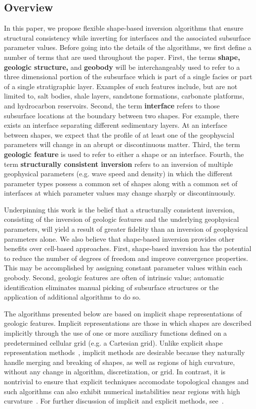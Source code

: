 \documentclass[manuscript,revised]{geophysics}
\begin{document}
\subsection{Overview}
In this paper, we propose flexible shape-based inversion algorithms that ensure structural consistency while inverting for interfaces and the associated subsurface parameter values.  Before going into the details of the algorithms, we first define a number of terms that are used throughout the paper.  First, the terms \textbf{shape, geologic structure,} and \textbf{geobody} will be interchangeably used to refer to a three dimensional portion of the subsurface which is part of a single facies or part of a single stratigraphic layer.  Examples of such features include, but are not limited to, salt bodies, shale layers, sandstone formations, carbonate platforms, and hydrocarbon reservoirs.  Second, the term \textbf{interface} refers to those subsurface locations at the boundary between two shapes.  For example, there exists an interface separating different sedimentary layers.  At an interface between shapes, we expect that the profile of at least one of the geophyscial parameters will change in an abrupt or discontinuous matter.  Third, the term \textbf{geologic feature} is used to refer to either a shape or an interface.  Fourth, the term \textbf{structurally consistent inversion} refers to an inversion of multiple geophysical parameters (e.g. wave speed and density) in which the different parameter types possess a common set of shapes along with a common set of interfaces at which parameter values may change sharply or discontinuously. 

Underpinning this work is the belief that a structurally consistent inversion, consisting of the inversion of geologic features and the underlying geophysical parameters, will yield a result of greater fidelity than an inversion of geophysical parameters alone.  We also believe that shape-based inversion provides other benefits over cell-based approaches.  First, shape-based inversion has the potential to reduce the number of degrees of freedom and improve convergence properties.  This may be accomplished by assigning constant parameter values within each geobody.   Second, geologic features are often of intrinsic value; automatic identification eliminates manual picking of subsurface structures or the application of additional algorithms to do so.

The algorithms presented below are based on implicit shape representations of geologic features.  Implicit representations are those in which shapes are described implicitly through the use of one or more auxiliary functions defined on a predetermined cellular grid (e.g. a Cartesian grid). Unlike explicit shape representation methods~\cite{Galley20}, implicit methods are desirable because they naturally handle merging and breaking of shapes, as well as regions of high curvature, without any change in algorithm, discretization, or grid.   In contrast, it is nontrivial to ensure that explicit techniques accomodate topological changes and such algorithms can also exhibit numerical instabilities near regions with high curvature~\cite{Abubakar_2009}.  For further discussion of implicit and explicit methods, see~\cite{Osher_1988}.
\end{document}
